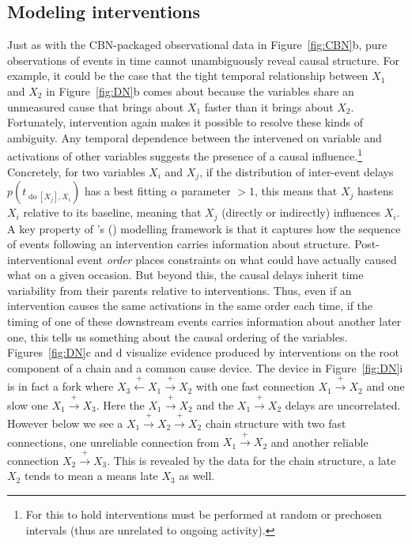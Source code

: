 \documentclass{cambridge7A}%
\newcommand{\sntodo}[2][]{\todo[caption={\textbf{NB}}, size=\footnotesize, color = aliceblue, #1]{#2}~}
\def\citeapos#1{\citeauthor{#1}'s (\citeyear{#1})}
\DeclareMathOperator*{\Do}{do}
\begin{document}
\subsection{Modeling interventions}

Just as with the CBN-packaged observational data in Figure~\ref{fig:CBN}b, pure observations of events in time cannot unambiguously reveal causal structure.  For example, it could be the case that the tight temporal relationship between $X_1$ and $X_2$ in Figure~\ref{fig:DN}b comes about because the variables share an unmeasured cause that brings about $X_1$ faster than it brings about $X_2$.  Fortunately, intervention again makes it possible to resolve these kinds of ambiguity.  Any temporal dependence between the intervened on variable and activations of other variables suggests the presence of a causal influence.\footnote{For this to hold interventions must be performed at random or prechosen intervals (thus are unrelated to ongoing activity).}  Concretely, for two variables $X_i$ and $X_j$, if the distribution of inter-event delays $p(t_{\Do[X_j], X_i})$ has a best fitting $\alpha$ parameter $>1$, this means that $X_j$ hastens $X_i$ relative to its baseline, meaning that $X_j$ (directly or indirectly) influences $X_i$.\sntodo{Prevention is a little more complicated:()}
A key property of \citeapos{bramley2018time} modelling framework is that it captures how the sequence of events following an intervention carries information about structure. Post-interventional event \emph{order} places constraints on what could have actually caused what on a given occasion.  But beyond this, the causal delays inherit time variability from their parents relative to interventions.  Thus, even if an intervention causes the same activations in the same order each time, if the timing of one of these downstream events carries information about another later one, this tells us something about the causal ordering of the variables.  Figures~\ref{fig:DN}c and d visualize  evidence produced by interventions on the root component of a chain and a common cause device.  The device in Figure~\ref{fig:DN}i is in fact a fork where $X_3\!\stackrel{+}\leftarrow\!X_1\!\stackrel{+}\rightarrow\!X_2$ with one fast connection $X_1\!\stackrel{+}\rightarrow\!X_2$ and one slow one $X_1\!\stackrel{+}\rightarrow\!X_3$.  Here the $X_1\!\stackrel{+}\rightarrow\!X_2$ and the $X_1\!\stackrel{+}\rightarrow\!X_2$ delays are uncorrelated.  However below we see a $X_1\!\stackrel{+}\rightarrow\!X_2\!\stackrel{+}\rightarrow\!X_2$ chain structure with two fast connections, one unreliable connection from $X_1\!\stackrel{+}\rightarrow\!X_2$ and another reliable connection $X_2\!\stackrel{+}\rightarrow\!X_3$.  This is revealed by the data for the chain structure, a late $X_2$ tends to mean a means late $X_3$ as well.
\end{document}
